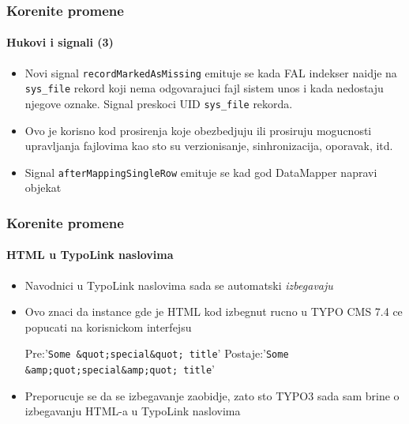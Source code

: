 \begin{frame}[fragile]
	\frametitle{Korenite promene}
	\framesubtitle{Hukovi i signali (3)}

	\begin{itemize}

		\item Novi signal \texttt{recordMarkedAsMissing} emituje se kada FAL indekser naidje na
			\texttt{sys\_file} rekord koji nema odgovarajuci fajl sistem unos i kada nedostaju njegove oznake. Signal preskoci UID \texttt{sys\_file} rekorda.

		\item Ovo je korisno kod prosirenja koje obezbedjuju ili prosiruju mogucnosti upravljanja fajlovima kao sto su verzionisanje, sinhronizacija, oporavak, itd.

		\item Signal \texttt{afterMappingSingleRow} emituje se kad god DataMapper napravi objekat

	\end{itemize}

\end{frame}


\begin{frame}[fragile]
	\frametitle{Korenite promene}
	\framesubtitle{HTML u TypoLink naslovima}

	\lstset{basicstyle=\tiny\ttfamily}

	\begin{itemize}

		\item Navodnici u TypoLink naslovima sada se automatski \textit{izbegavaju}
		\item Ovo znaci da instance gde je HTML kod izbegnut rucno u TYPO CMS 7.4 ce popucati na korisnickom interfejsu

			Pre:\tabto{1.8cm}'\texttt{Some \&quot;special\&quot; title}'\newline
			Postaje:\tabto{1.8cm}'\texttt{Some \&amp;quot;special\&amp;quot; title}'

		\item Preporucuje se da se izbegavanje zaobidje, zato sto TYPO3 sada sam brine o izbegavanju HTML-a u TypoLink naslovima

	\end{itemize}

	\breakingchange

\end{frame}

